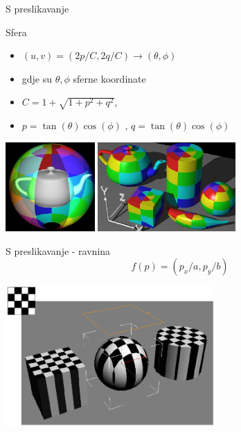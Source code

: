\documentclass[9pt]{beamer}
\begin{document}
\begin{frame}{S preslikavanje}
	\begin{block}{Sfera}
		\begin{itemize}
			\item $(u,v)=(2p/C,2q/C)\rightarrow (\theta, \phi)$
			\item gdje su $\theta, \phi$ sferne koordinate
			\item $C = 1+\sqrt{1+p^2+q^2}$,
			\item $p=\tan(\theta)\cos(\phi)$ , $q=\tan(\theta)\cos(\phi)$
			
		\end{itemize}
	\end{block}
	\begin{center}
		\includegraphics[height=3.4cm]{slike/teksture_kugla_01.png}
		\includegraphics[height=3.4cm]{slike/teksture_kugla_02.png}
	\end{center}
\end{frame}
%
\begin{frame}{S preslikavanje - ravnina}
	$$ f(p) = (p_{x}/a, p_{y}/b)$$ 
	\begin{center}
		\includegraphics[width=8cm]{slike/02_projekcije_planar.png}
	\end{center}
\end{frame}
\end{document}

